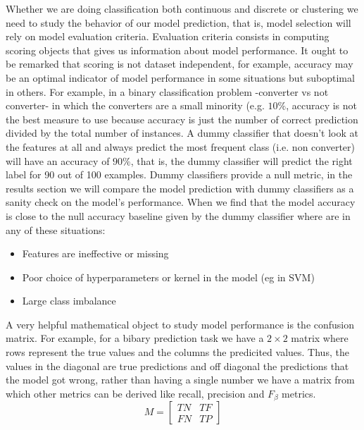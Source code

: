 \documentclass[11pt]{article}
\begin{document}
Whether we are doing classification both continuous and discrete or clustering we need to study the behavior of our model prediction, that is, model selection will rely on model evaluation criteria. Evaluation criteria consists in computing scoring objects that gives us information about model performance. It ought to be remarked that scoring is not dataset independent, for example, accuracy may be an optimal indicator of model performance in some situations but suboptimal in others. For example, in a binary classification problem -converter vs not converter- in which the converters are a small minority (e.g. $10\%$, accuracy is not the best measure to use because accuracy is just the number of correct prediction divided by the total number of instances. A dummy classifier that doesn't look at the features at all and always predict the most frequent class (i.e. non converter) will have an accuracy of $90\%$, that is, the dummy classifier will predict the right label for 90 out of 100 examples.
Dummy classifiers provide a null metric, in the results section we will compare the model prediction with dummy classifiers as a sanity check on the model's performance.
When we find that the model accuracy is close to the null accuracy baseline given by the dummy classifier where are in any of these situations:
\begin{itemize}
	\item Features are ineffective or missing
	\item Poor choice of hyperparameters or kernel in the model (eg in SVM) 
	\item Large class imbalance 
\end{itemize}
 A very helpful mathematical object to study model performance is the confusion matrix. For example, for a bibary prediction task we have a $2 \times 2$ matrix where rows represent the true values and the columns the predicited values. Thus, the values in the diagonal are true predictions and off diagonal the predictions that the model got wrong, rather  than having a single number we have a matrix from which other metrics can be derived like recall, precision and $F_\beta$ metrics.
\[
M=
  \begin{bmatrix}
    TN & TF  \\
    FN & TP 
  \end{bmatrix}
\]
\end{document}
